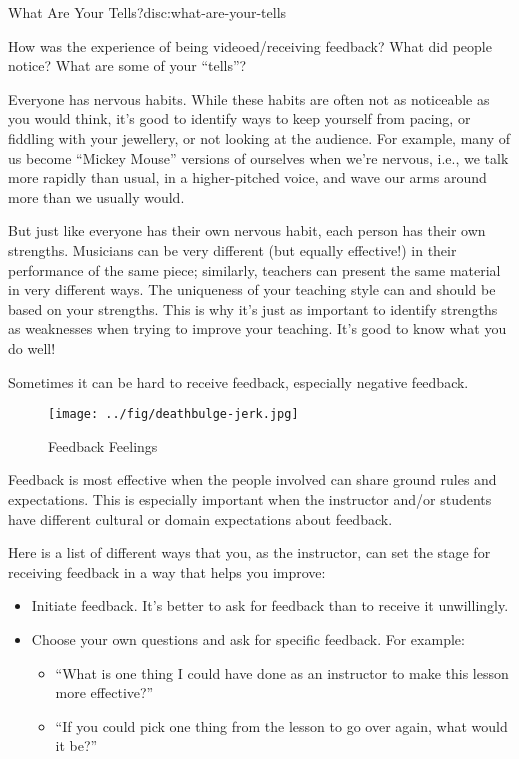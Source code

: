 
\begin{discussion}{What Are Your Tells?}{disc:what-are-your-tells}

How was the experience of being videoed/receiving feedback? What did
people notice? What are some of your ``tells''?
\end{discussion}

Everyone has nervous habits. While these habits are often not as
noticeable as you would think, it's good to identify ways to keep
yourself from pacing, or fiddling with your jewellery, or not looking at
the audience. For example, many of us become ``Mickey Mouse'' versions
of ourselves when we're nervous, i.e., we talk more rapidly than usual,
in a higher-pitched voice, and wave our arms around more than we usually
would.

But just like everyone has their own nervous habit, each person has
their own strengths. Musicians can be very different (but equally
effective!) in their performance of the same piece; similarly, teachers
can present the same material in very different ways. The uniqueness of
your teaching style can and should be based on your strengths. This is
why it's just as important to identify strengths as weaknesses when
trying to improve your teaching. It's good to know what you do well!


Sometimes it can be hard to receive feedback, especially negative
feedback.

\begin{figure}[htbp]
\centering
\texttt{[image: ../fig/deathbulge-jerk.jpg]}
\caption{Feedback Feelings}
\end{figure}

Feedback is most effective when the people involved can share ground
rules and expectations. This is especially important when the instructor
and/or students have different cultural or domain expectations about
feedback.

Here is a list of different ways that you, as the instructor, can set
the stage for receiving feedback in a way that helps you improve:

\begin{itemize}
\item
  Initiate feedback. It's better to ask for feedback than to receive it
  unwillingly.
\item
  Choose your own questions and ask for specific feedback. For example:

  \begin{itemize}
    \item
    ``What is one thing I could have done as an instructor to make this
    lesson more effective?''
  \item
    ``If you could pick one thing from the lesson to go over again, what
    would it be?''
  \end{itemize}
\end{itemize}

